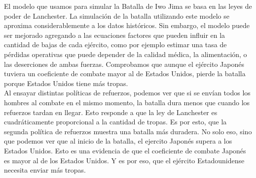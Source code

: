 \documentclass[10pt,journal,compsoc]{IEEEtran}
\begin{document}
El modelo que usamos para simular la Batalla de Iwo Jima se basa en las leyes de poder de Lanchester. La 
simulaci\'on de la batalla utilizando este modelo se aproxima considerablemente a los datos hist\'oricos. Sin embargo, el 
modelo puede ser mejorado agregando a las ecuaciones factores que 
pueden influir en la cantidad de bajas de cada ej\'ercito, como por ejemplo estimar una tasa de p\'erdidas operativas
que puede depender de la calidad m\'edica, la alimentaci\'on, o las deserciones de ambas fuerzas. Comprobamos que aunque el ej\'ercito
Japon\'es tuviera un coeficiente de combate mayor al de Estados Unidos, pierde la batalla porque Estados Unidos tiene m\'as tropas.\\
\indent Al ensayar distintas pol\'iticas de refuerzos, podemos ver que si se env\'ian todos los hombres al combate en
el mismo momento, la batalla dura menos que cuando los refuerzos tardan en llegar. Esto responde a que la ley 
de Lanchester es cuadr\'aticamente proporcional a la cantidad de tropas. Es por esto, que la segunda pol\'itica
de refuerzos muestra una batalla m\'as duradera. No solo eso, sino que podemos ver que al inicio de la batalla,
el ejercito Japon\'es supera a los Estados Unidos. Esto es una evidencia de que el coeficiente de combate Japon\'es
es mayor al de los Estados Unidos. Y es por eso, que el ej\'ercito Estadounidense necesita enviar m\'as tropas.







%
\end{document}
